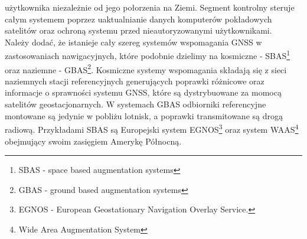 użytkownika niezależnie od jego połorzenia na Ziemi.
Segment kontrolny steruje całym systemem poprzez uaktualnianie danych komputerów pokładowych satelitów oraz ochroną systemu przed nieautoryzowanymi użytkownikami.\\
\indent Należy dodać, że istanieje cały szereg systemów wspomagania GNSS w zastosowaniach nawigacyjnych, które podobnie dzielimy na kosmiczne - SBAS\footnote{
SBAS - space based augmentation systems} oraz naziemne - GBAS\footnote{GBAS - ground based augmentation systems}.
Kosmiczne systemy wspomagania składają się z sieci naziemnych stacji referencyjnych generujących poprawki różnicowe oraz informacje o sprawności systemu GNSS, 
które są dystrybuowane za momocą satelitów geostacjonarnych. W systemach GBAS odbiorniki referencyjne montowane są jedynie w pobliżu lotnisk, a poprawki 
transmitowane są drogą radiową. Przykładami SBAS są Europejski system EGNOS\footnote{EGNOS - European Geostationary Navigation Overlay Service.} 
oraz system WAAS\footnote{Wide Area Augmentation System} obejmujący swoim zasięgiem Amerykę Północną. 
